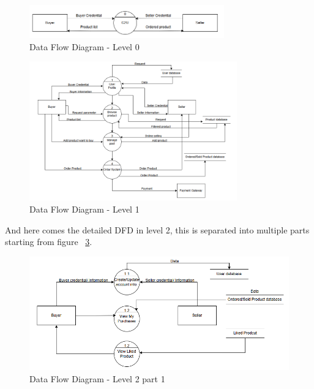 \begin{figure}[!h]
	\centering
	\includegraphics[width=0.75\textwidth]{chapters/ch-03/DFDL0.png} %
	\caption{Data Flow Diagram - Level 0}
	\label{fig:DFD0} %
\end{figure}

\begin{figure}[!h]
	\centering
	\includegraphics[width=0.8\textwidth]{chapters/ch-03/DFDL1.png} %
	\caption{Data Flow Diagram - Level 1}
	\label{fig:DFD1} %
\end{figure}

And here comes the detailed DFD in level 2, this is separated into multiple parts starting from figure ~\ref{fig:DFD2}.

\begin{figure}[!h]
	\centering
	\includegraphics[width=1\textwidth]{chapters/ch-03/DFDL2_1.png} %
	\caption{Data Flow Diagram - Level 2 part 1}
	\label{fig:DFD2} %
\end{figure}

